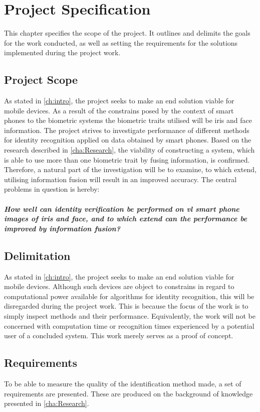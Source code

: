 \chapter{Project Specification}\glsresetall
This chapter specifies the scope of the project. It outlines and delimits the goals for the work conducted, as well as setting the requirements for the solutions implemented during the project work. 

\section{Project Scope}
As stated in \autoref{ch:intro}, the project seeks to make an end solution viable for mobile devices. As a result of the constrains posed by the context of smart phones to the biometric systems the biometric traits utilised will be iris and face information. The project strives to investigate performance of different methods for identity recognition applied on data obtained by smart phones. Based on the research described in \autoref{cha:Research}, the viability of constructing a system, which is able to use more than one biometric trait by fusing information, is confirmed. Therefore, a natural part of the investigation will be to examine, to which extend, utilising information fusion will result in an improved accuracy. The central problems in question is hereby:\\\\
\textit{\textbf{How well can identity verification be performed on \gls{vl} smart phone images of iris and face, and to which extend can the performance be improved by information fusion?}}

\section{Delimitation}\label{sec:deliproject}
As stated in \autoref{ch:intro}, the project seeks to make an end solution viable for mobile devices. Although such devices are object to constrains in regard to computational power available for algorithms for identity recognition, this will be disregarded during the project work. This is because the focus of the work is to simply inspect methods and their performance. Equivalently, the work will not be concerned with computation time or recognition times experienced by a potential user of a concluded system. This work merely serves as a proof of concept.

\section{Requirements}\label{ch:req}
To be able to measure the quality of the identification method made, a set of requirements are presented. These are produced on the background of knowledge presented in \autoref{cha:Research}.

